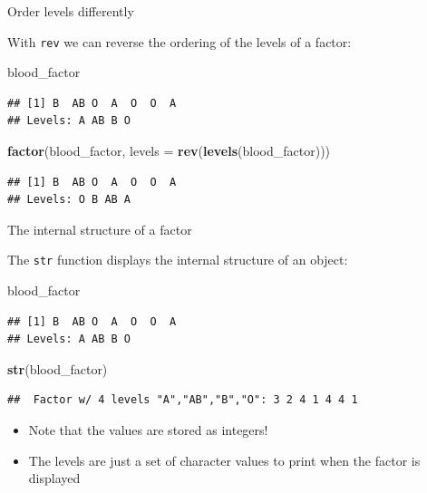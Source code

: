\documentclass[ignorenonframetext,]{beamer}
\newenvironment{Shaded}{\begin{snugshade}}{\end{snugshade}}
\newcommand{\DataTypeTok}[1]{\textcolor[rgb]{0.13,0.29,0.53}{#1}}
\newcommand{\KeywordTok}[1]{\textcolor[rgb]{0.13,0.29,0.53}{\textbf{#1}}}
\newcommand{\NormalTok}[1]{#1}
\begin{document}
\begin{frame}[fragile]{Order levels differently}
\protect\hypertarget{order-levels-differently-2}{}

With \texttt{rev} we can reverse the ordering of the levels of a factor:

\begin{Shaded}
\begin{Highlighting}[]
\NormalTok{blood_factor}
\end{Highlighting}
\end{Shaded}

\begin{verbatim}
## [1] B  AB O  A  O  O  A 
## Levels: A AB B O
\end{verbatim}

\begin{Shaded}
\begin{Highlighting}[]
\KeywordTok{factor}\NormalTok{(blood_factor, }
  \DataTypeTok{levels =} \KeywordTok{rev}\NormalTok{(}\KeywordTok{levels}\NormalTok{(blood_factor)))}
\end{Highlighting}
\end{Shaded}

\begin{verbatim}
## [1] B  AB O  A  O  O  A 
## Levels: O B AB A
\end{verbatim}

\end{frame}

\begin{frame}[fragile]{The internal structure of a factor}
\protect\hypertarget{the-internal-structure-of-a-factor}{}

The \texttt{str} function displays the internal structure of an object:

\begin{Shaded}
\begin{Highlighting}[]
\NormalTok{blood_factor}
\end{Highlighting}
\end{Shaded}

\begin{verbatim}
## [1] B  AB O  A  O  O  A 
## Levels: A AB B O
\end{verbatim}

\begin{Shaded}
\begin{Highlighting}[]
\KeywordTok{str}\NormalTok{(blood_factor)}
\end{Highlighting}
\end{Shaded}

\begin{verbatim}
##  Factor w/ 4 levels "A","AB","B","O": 3 2 4 1 4 4 1
\end{verbatim}

\begin{itemize}
\item
  Note that the values are stored as integers!
\item
  The levels are just a set of character values to print when the factor
  is displayed
\end{itemize}

\end{frame}
\end{document}

